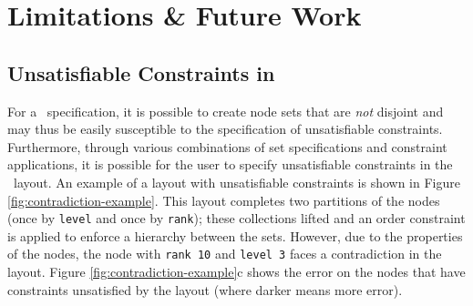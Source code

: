 \section{Limitations \& Future Work}






\subsection{Unsatisfiable Constraints in \projectname}
For a \projectname\ specification, it is possible to create node sets that
are \emph{not} disjoint and may thus be easily susceptible to the
specification of unsatisfiable constraints. Furthermore, through various
combinations of set specifications and constraint applications, it is
possible for the user to specify unsatisfiable constraints in the
\projectname\ layout. An example of a layout with unsatisfiable constraints
is shown in Figure \ref{fig:contradiction-example}. This layout completes
two partitions of the nodes (once by \texttt{level} and once by
\texttt{rank}); these collections lifted and an order constraint is applied
to enforce a hierarchy between the sets. However, due to the properties of
the nodes, the node with \texttt{rank 10} and \texttt{level 3} faces a
contradiction in the layout. Figure \ref{fig:contradiction-example}c shows
the error on the nodes that have constraints unsatisfied by the layout
(where darker means more error).

